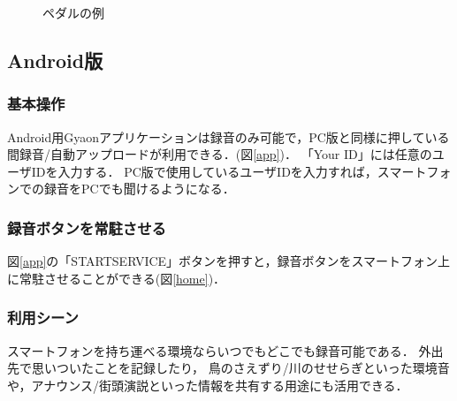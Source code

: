 \begin{figure}[H]
\centering
{}
\caption{ペダルの例}
\label{pedal}
\end{figure}


\subsection{Android版}

\subsubsection{基本操作}
Android用Gyaonアプリケーションは録音のみ可能で，PC版と同様に押している間録音/自動アップロードが利用できる．(図\ref{app})．
「Your ID」には任意のユーザIDを入力する．
PC版で使用しているユーザIDを入力すれば，スマートフォンでの録音をPCでも聞けるようになる．

\subsubsection{録音ボタンを常駐させる}
図\ref{app}の「STARTSERVICE」ボタンを押すと，録音ボタンをスマートフォン上に常駐させることができる(図\ref{home})．

\subsubsection{利用シーン}
スマートフォンを持ち運べる環境ならいつでもどこでも録音可能である．
外出先で思いついたことを記録したり，
鳥のさえずり/川のせせらぎといった環境音や，アナウンス/街頭演説といった情報を共有する用途にも活用できる．

